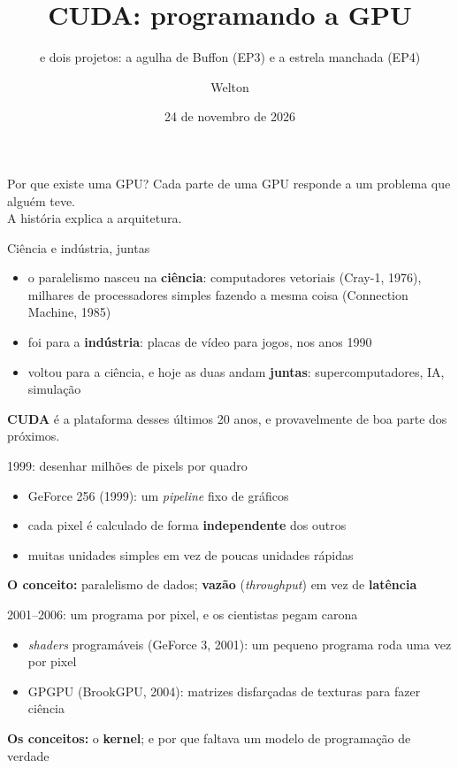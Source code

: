 \documentclass[aspectratio=169,11pt]{beamer}
\title{CUDA: programando a GPU}
\subtitle{e dois projetos: a agulha de Buffon (EP3) e a estrela manchada (EP4)}
\author{Welton}
\institute{AGA 511 · Métodos Computacionais em Astronomia · IAG/USP}
\date{24 de novembro de 2026}
\begin{document}
\begin{frame}
  \titlepage
\end{frame}


\begin{frame}{Por que existe uma GPU?}
  \centering\Large
  Cada parte de uma GPU responde a um problema que alguém teve.\\[1em]
  \normalsize A história explica a arquitetura.
\end{frame}

\begin{frame}{Ciência e indústria, juntas}
  \begin{itemize}
    \item o paralelismo nasceu na \textbf{ciência}: computadores vetoriais (Cray-1, 1976), milhares de processadores simples fazendo a mesma coisa (Connection Machine, 1985)
    \item foi para a \textbf{indústria}: placas de vídeo para jogos, nos anos 1990
    \item voltou para a ciência, e hoje as duas andam \textbf{juntas}: supercomputadores, IA, simulação
  \end{itemize}
  \vfill
  \textbf{CUDA} é a plataforma desses últimos 20 anos, e provavelmente de boa parte dos próximos.
\end{frame}

\begin{frame}{1999: desenhar milhões de pixels por quadro}
  \begin{itemize}
    \item GeForce 256 (1999): um \emph{pipeline} fixo de gráficos
    \item cada pixel é calculado de forma \textbf{independente} dos outros
    \item muitas unidades simples em vez de poucas unidades rápidas
  \end{itemize}
  \vfill
  \textbf{O conceito:} paralelismo de dados; \textbf{vazão} (\emph{throughput}) em vez de \textbf{latência}
\end{frame}

\begin{frame}{2001--2006: um programa por pixel, e os cientistas pegam carona}
  \begin{itemize}
    \item \emph{shaders} programáveis (GeForce 3, 2001): um pequeno programa roda uma vez por pixel
    \item GPGPU (BrookGPU, 2004): matrizes disfarçadas de texturas para fazer ciência
  \end{itemize}
  \vfill
  \textbf{Os conceitos:} o \textbf{kernel}; e por que faltava um modelo de programação de verdade
\end{frame}
\end{document}
